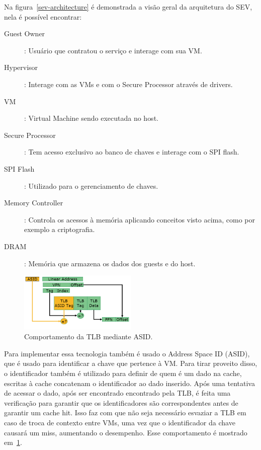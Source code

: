 \documentclass{report}
\begin{document}
Na figura~\ref{sev-architecture} é demonstrada a visão geral da arquitetura do
SEV, nela é possível encontrar:

\begin{description}
    \item[Guest Owner]: Usuário que contratou o serviço e interage com sua VM\@.
    \item[Hypervisor]: Interage com as VMs e com o Secure Processor através de
    drivers.
    \item[VM]: Virtual Machine sendo executada no host.
    \item[Secure Processor]: Tem acesso exclusivo ao banco de chaves e interage
    com o SPI flash.
    \item[SPI Flash]: Utilizado para o gerenciamento de chaves.
    \item[Memory Controller]: Controla os acessos à memória aplicando
    conceitos visto acima, como por exemplo a criptografia.
    \item[DRAM]: Memória que armazena os dados dos guests e do host.
\end{description}

\begin{figure}[h]
    \centering
    \includegraphics[width=0.5\textwidth]{img/asid}
    \caption{Comportamento da TLB mediante ASID\@.}\label{asid}
\end{figure}

Para implementar essa tecnologia também é usado o Address Space ID (ASID), que
é usado para identificar a chave que pertence à VM\@. Para tirar proveito
disso, o identificador também é utilizado para definir de quem é um dado na
cache, escritas à cache concatenam o identificador ao dado inserido. Após uma
tentativa de acessar o dado, após ser encontrado encontrado pela TLB, é feita
uma verificação para garantir que os identificadores são correspondentes antes
de garantir um cache hit. Isso faz com que não seja necessário esvaziar a TLB
em caso de troca de contexto entre VMs, uma vez que o identificador da chave
causará um miss, aumentando o desempenho. Esse comportamento é mostrado
em~\ref{asid}.
\end{document}
